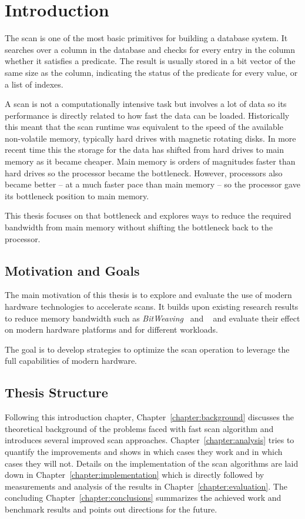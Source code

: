 \chapter{Introduction}

The scan is one of the most basic primitives for building a database system. It
searches over a column in the database and checks for every entry in the column
whether it satisfies a predicate. The result is usually stored in a bit vector
of the same size as the column, indicating the status of the predicate for
every value, or a list of indexes.

A scan is not a computationally intensive task but involves a lot of data so
its performance is directly related to how fast the data can be loaded.
Historically this meant that the scan runtime was equivalent to the speed of
the available non-volatile memory, typically hard drives with magnetic rotating
disks. In more recent time this the storage for the data has shifted from hard
drives to main memory as it became cheaper. Main memory is orders of magnitudes
faster than hard drives so the processor became the bottleneck. However,
processors also became better -- at a much faster pace than main memory --
so the processor gave its bottleneck position to main memory.

This thesis focuses on that bottleneck and explores ways to reduce the required
bandwidth from main memory without shifting the bottleneck back to the
processor.

\section{Motivation and Goals}

The main motivation of this thesis is to explore and evaluate the use of modern
hardware technologies to accelerate scans. It builds upon existing research
results to reduce memory bandwidth such as \emph{BitWeaving}~\cite{BitWeaving}
and \simdscan{}~\cite{SIMD-Scan} and evaluate their effect on modern hardware
platforms and for different workloads.

The goal is to develop strategies to optimize the scan operation to leverage
the full capabilities of modern hardware.

\section{Thesis Structure}

Following this introduction chapter, Chapter~\ref{chapter:background} discusses
the theoretical background of the problems faced with fast scan algorithm and
introduces several improved scan approaches. Chapter~\ref{chapter:analysis}
tries to quantify the improvements and shows in which cases they work and in
which cases they will not. Details on the implementation of the scan algorithms
are laid down in Chapter~\ref{chapter:implementation} which is directly
followed by measurements and analysis of the results in
Chapter~\ref{chapter:evaluation}. The concluding
Chapter~\ref{chapter:conclusions} summarizes the achieved work and benchmark
results and points out directions for the future.
